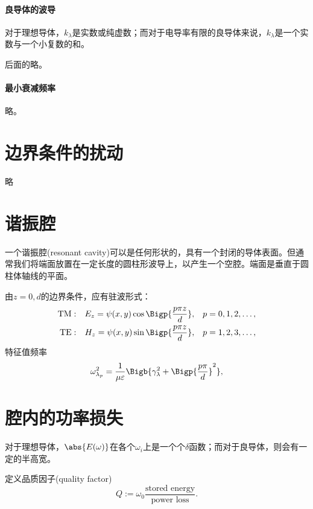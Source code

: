 \paragraph{良导体的波导}
对于理想导体，$k_\lambda$是实数或纯虚数；而对于电导率有限的良导体来说，$k_\lambda$是一个实数与一个小复数的和。

后面的略。
\paragraph{最小衰减频率}
略。
\section{边界条件的扰动}
略
\section{谐振腔}
一个谐振腔(resonant cavity)可以是任何形状的，具有一个封闭的导体表面。但通常我们将端面放置在一定长度的圆柱形波导上，以产生一个空腔。端面是垂直于圆柱体轴线的平面。

由$z=0,d$的边界条件，应有驻波形式：
\begin{align*}
    \text{TM}&:&E_z=\psi(x,y)\cos\Bigp{\frac{p\pi z}d},&&p&=0,1,2,\ldots,\\
    \text{TE}&:&H_z=\psi(x,y)\sin\Bigp{\frac{p\pi z}d},&&p&=1,2,3,\ldots,
\end{align*}
特征值频率
\[
    \omega_{\lambda_p}^2=\frac1{\mu\varepsilon}\Bigb{\gamma_\lambda^2+\Bigp{\frac{p\pi}d}^2},
\]





\section{腔内的功率损失}
对于理想导体，$\abs{E(\omega)}$在各个$\omega_i$上是一个个$\delta$函数；而对于良导体，则会有一定的半高宽。

定义品质因子(quality factor)
\begin{equation}
    Q:=\omega_0\frac{\text{stored energy}}{\text{power loss}}.
\end{equation}

